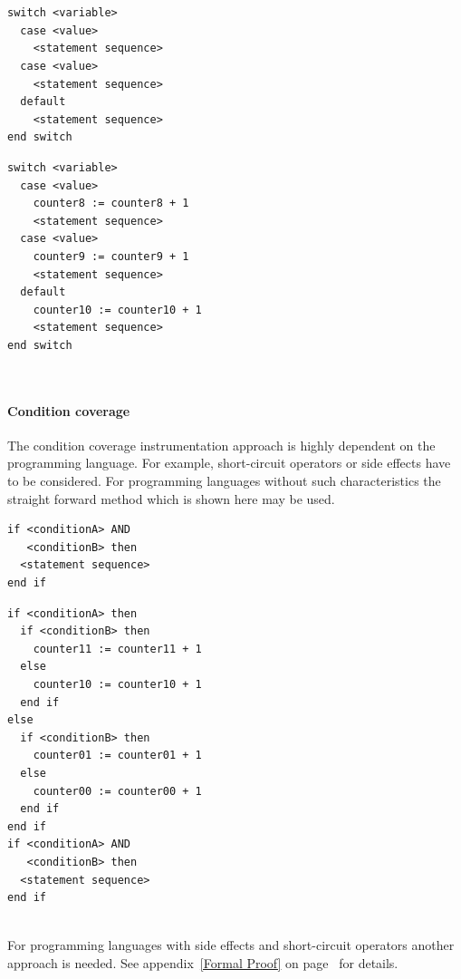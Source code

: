 \newline\\\\
\begin{minipage}[t]{0.5\textwidth}
\begin{verbatim}
switch <variable>
  case <value> 
    <statement sequence>
  case <value> 
    <statement sequence>
  default
    <statement sequence>
end switch
\end{verbatim}
\end{minipage}
\begin{minipage}[t]{0.5\textwidth}
\begin{verbatim}
switch <variable>
  case <value> 
    counter8 := counter8 + 1
    <statement sequence>
  case <value> 
    counter9 := counter9 + 1
    <statement sequence>
  default
    counter10 := counter10 + 1
    <statement sequence>
end switch
\end{verbatim}
\end{minipage}
\newline\\

\paragraph{Condition coverage}
The condition coverage instrumentation approach is highly dependent on the programming language. For example, short-circuit operators or side effects have to be considered. For programming languages without such characteristics the straight forward method which is shown here may be used.
\newline\\
\begin{minipage}[t]{0.5\textwidth}
\begin{verbatim}
if <conditionA> AND 
   <conditionB> then 
  <statement sequence>
end if
\end{verbatim}
\end{minipage}
\begin{minipage}[t]{0.5\textwidth}
\begin{verbatim}
if <conditionA> then
  if <conditionB> then
    counter11 := counter11 + 1
  else
    counter10 := counter10 + 1
  end if
else
  if <conditionB> then
    counter01 := counter01 + 1
  else
    counter00 := counter00 + 1
  end if
end if
if <conditionA> AND 
   <conditionB> then 
  <statement sequence>
end if
\end{verbatim}
\end{minipage}
\newline\\
For programming languages with side effects and short-circuit operators another approach is needed. See appendix~\ref{Formal Proof} on page~\pageref{Formal Proof} for details.
\newline\\

